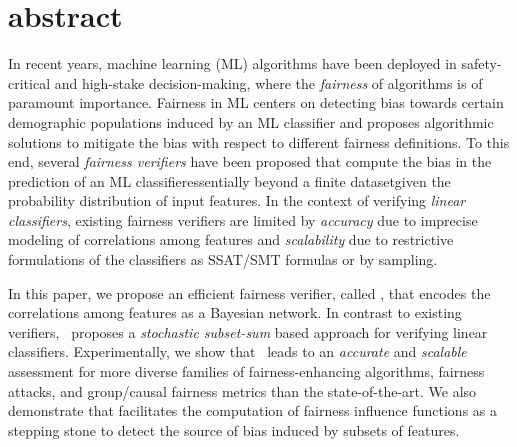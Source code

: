 \section{abstract}
In recent years, machine learning (ML) algorithms have been deployed in safety-critical and high-stake decision-making, where the \textit{fairness} of algorithms is of paramount importance. Fairness in ML  centers on detecting bias towards certain demographic populations induced by an ML classifier and proposes algorithmic solutions to mitigate the bias with respect to different fairness definitions.  To this end, several \textit{fairness verifiers} have been proposed that compute the bias in the prediction of an ML classifier\textemdash essentially beyond a finite dataset\textemdash given the probability distribution of input features. In the context of verifying \textit{linear classifiers}, existing fairness verifiers are limited by \emph{accuracy} due to imprecise modeling of correlations among features and \emph{scalability} due to restrictive formulations of the classifiers as SSAT/SMT formulas or by sampling. 

In this paper, we propose an efficient fairness verifier, called \fvgm, that encodes the correlations among features as a Bayesian network. In contrast to existing verifiers, \fvgm~proposes a \textit{stochastic subset-sum} based approach for verifying linear classifiers. Experimentally, we show that  \fvgm~leads to an \textit{accurate} and \textit{scalable} assessment for more diverse families of fairness-enhancing algorithms, fairness attacks, and group/causal fairness metrics than the state-of-the-art. We also demonstrate that {\fvgm} facilitates the computation of fairness influence functions as a stepping stone to detect the source of bias induced by subsets of features.








